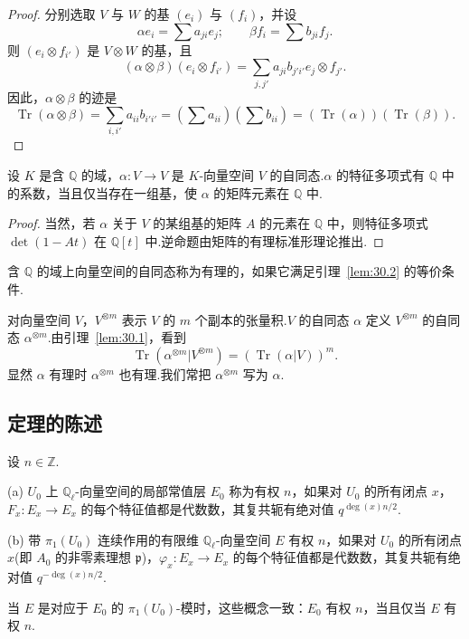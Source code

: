 \begin{proof}
分别选取 $V$ 与 $W$ 的基 $(e_i)$ 与 $(f_i)$，并设
\[
\alpha e_i = \sum a_{ji} e_j; \qquad \beta f_i = \sum b_{ji} f_j.
\]
则 $(e_i \otimes f_{i'})$ 是 $V \otimes W$ 的基，且
\[
(\alpha \otimes \beta)(e_i \otimes f_{i'}) = \sum_{j, j'} a_{ji} b_{j'i'} e_j \otimes f_{j'}.
\]
因此，$\alpha \otimes \beta$ 的迹是
\[
\operatorname{Tr}(\alpha \otimes \beta) = \sum_{i, i'} a_{ii} b_{i'i'} = \left( \sum a_{ii} \right) \left( \sum b_{ii} \right) = (\operatorname{Tr}(\alpha))(\operatorname{Tr}(\beta)).
\]
\end{proof}

\begin{lemma}\label{lem:30.2}
设 $K$ 是含 $\mathbb{Q}$ 的域，$\alpha \colon V \to V$ 是 $K$-向量空间 $V$ 的自同态.$\alpha$ 的特征多项式有 $\mathbb{Q}$ 中的系数，当且仅当存在一组基，使 $\alpha$ 的矩阵元素在 $\mathbb{Q}$ 中.
\end{lemma}

\begin{proof}
当然，若 $\alpha$ 关于 $V$ 的某组基的矩阵 $A$ 的元素在 $\mathbb{Q}$ 中，则特征多项式 $\det(1 - At)$ 在 $\mathbb{Q}[t]$ 中.逆命题由矩阵的有理标准形理论推出.
\end{proof}

\begin{definition}\label{def:30.3}
含 $\mathbb{Q}$ 的域上向量空间的自同态称为有理的，如果它满足引理~\ref{lem:30.2} 的等价条件.
\end{definition}

对向量空间 $V$，$V^{\otimes m}$ 表示 $V$ 的 $m$ 个副本的张量积.$V$ 的自同态 $\alpha$ 定义 $V^{\otimes m}$ 的自同态 $\alpha^{\otimes m}$.由引理~\ref{lem:30.1}，看到
\[
\operatorname{Tr}(\alpha^{\otimes m}|V^{\otimes m}) = (\operatorname{Tr}(\alpha|V))^{m}.
\]
显然 $\alpha$ 有理时 $\alpha^{\otimes m}$ 也有理.我们常把 $\alpha^{\otimes m}$ 写为 $\alpha$.

\subsection*{定理的陈述}

\begin{definition}\label{def:30.4}
设 $n \in \mathbb{Z}$.

(a) $U_0$ 上 $\mathbb{Q}_{\ell}$-向量空间的局部常值层 $E_0$ 称为有权 $n$，如果对 $U_0$ 的所有闭点 $x$，$F_x \colon E_x \to E_x$ 的每个特征值都是代数数，其复共轭有绝对值 $q^{\deg(x)n/2}$.

(b) 带 $\pi_1(U_0)$ 连续作用的有限维 $\mathbb{Q}_{\ell}$-向量空间 $E$ 有权 $n$，如果对 $U_0$ 的所有闭点 $x$(即 $A_0$ 的非零素理想 $\mathfrak{p}$)，$\varphi_x \colon E_x \to E_x$ 的每个特征值都是代数数，其复共轭有绝对值 $q^{-\deg(x)n/2}$.

当 $E$ 是对应于 $E_0$ 的 $\pi_1(U_0)$-模时，这些概念一致：$E_0$ 有权 $n$，当且仅当 $E$ 有权 $n$.
\end{definition}

